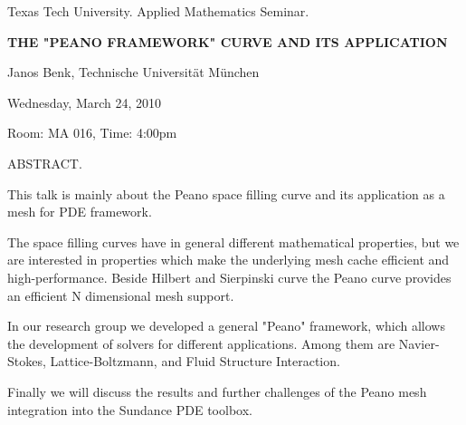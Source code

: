 \documentclass[oneside]{amsart}
\newcommand{\talktitle}{
The "Peano framework" curve and its application
}
\newcommand{\talkspeaker}{Janos Benk, Technische Universität München}
\newcommand{\talkdate}{Wednesday, March 24, 2010}
\newcommand{\talkabstract}{
This talk is mainly about the Peano space filling curve and its
application as a mesh for PDE framework. 

  The space filling curves have in general different mathematical
properties, but we are interested in properties which make the
underlying mesh cache efficient and high-performance. Beside Hilbert and
Sierpinski curve the Peano curve provides an efficient N dimensional
mesh support.

  In our research group we developed a general "Peano" framework, which
allows the development of solvers for different applications. Among them
are Navier-Stokes, Lattice-Boltzmann, and Fluid Structure Interaction.

  Finally we will discuss the results and further challenges of the
Peano mesh integration into the Sundance PDE toolbox.
}
\begin{document}
\thispagestyle{empty}

\begin{center}
Texas Tech University.  Applied Mathematics Seminar.

\end{center}

\begin{center}

\textbf{\LARGE {\uppercase{\talktitle}} }

\talkspeaker

\talkdate

Room: MA 016, Time: 4:00pm

\end{center}

ABSTRACT.
\talkabstract
\end{document}
